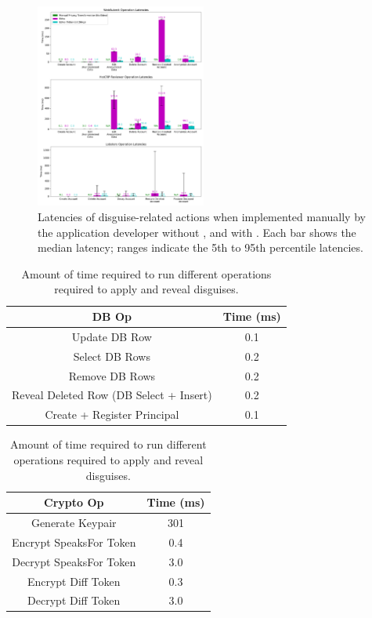 \begin{figure}[t!] 
    \centering
    \includegraphics[width=0.5\textwidth]{figs/client_op_stats} 
    \caption{Latencies of disguise-related actions when implemented manually by the 
    application developer without \sys, and with \sys.  
    Each bar shows the median latency; ranges indicate the 5th to 95th
    percentile latencies.  } 
    \label{fig:client_opstats}
\end{figure}

\begin{table}[h!]
\begin{center}
\begin{tabular}{ c c }
\textbf{DB Op} & \textbf{Time (ms)}\\
\hline
Update DB Row & 0.1\\ 
Select DB Rows & 0.2\\
Remove DB Rows & 0.2\\
Reveal Deleted Row (DB Select + Insert) & 0.2 \\
Create + Register Principal & 0.1\\
\end{tabular}
\quad
\begin{tabular}{ c c }
\textbf{Crypto Op} & \textbf{Time (ms)}\\
\hline
Generate Keypair & 301\\
Encrypt SpeaksFor Token & 0.4\\
Decrypt SpeaksFor Token & 3.0\\
Encrypt Diff Token & 0.3\\
Decrypt Diff Token & 3.0\\
\end{tabular}
\end{center}
\caption{Amount of time required to run different operations required to apply and reveal disguises.}
\label{tab:opstats}
\end{table}

